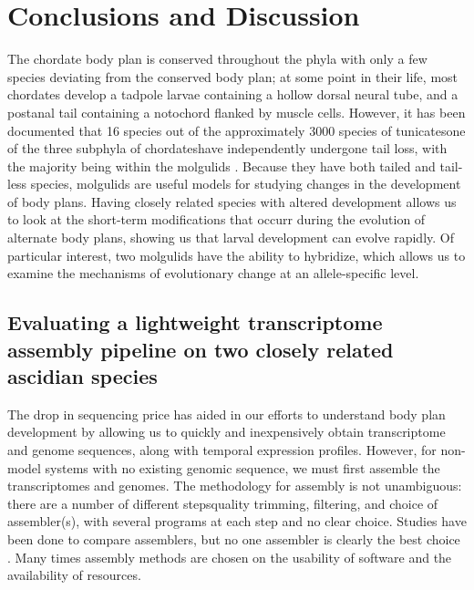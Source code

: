 \chapter{Conclusions and Discussion}

The chordate body plan is conserved throughout the phyla with only a few species deviating from the conserved body plan; at some point in their life, most chordates develop a tadpole larvae containing a hollow dorsal neural tube, and a postanal tail containing a notochord flanked by muscle cells. However, it has been documented that 16 species out of the approximately 3000 species of tunicates\textemdash one of the three subphyla of chordates\textemdash have independently undergone tail loss, with the majority being within the molgulids \cite{berrill_studies_1931,huber_evolution_2000}. Because they have both tailed and tail-less species, molgulids are useful models for studying changes in the development of body plans. Having closely related species with altered development allows us to look at the short-term modifications that occurr during the evolution of alternate body plans, showing us that larval development can evolve rapidly. Of particular interest, two molgulids have the ability to hybridize, which allows us to examine the mechanisms of evolutionary change at an allele-specific level.

\section{Evaluating a lightweight transcriptome assembly pipeline on two closely related ascidian species}
The drop in sequencing price has aided in our efforts to understand body plan development by allowing us to quickly and inexpensively obtain transcriptome and genome sequences, along with temporal expression profiles. However, for non-model systems with no existing genomic sequence, we must first assemble the transcriptomes and genomes.  The methodology for assembly is not unambiguous: there are a number of different steps\textemdash quality trimming, filtering, and choice of assembler(s), with several programs at each step and no clear choice. Studies have been done to compare assemblers, but no one assembler is clearly the best choice \cite{clarke_comparative_2013}. Many times assembly methods are chosen on the usability of software and the availability of resources.

